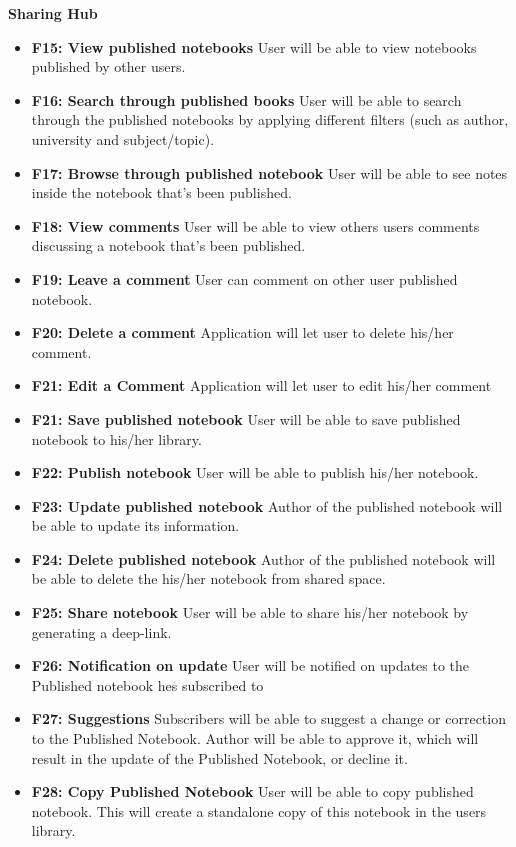 \documentclass[thesis=B,english]{FITthesis}[2012/10/20]
\begin{document}
\bigskip
\textbf{Sharing Hub}
\begin{itemize}
	\item \textbf{F15: View published notebooks} User will be able to view notebooks published by other users.
	\item \textbf{F16: Search through published books} User will be able to search through the published notebooks by applying different filters (such as author, university and subject/topic).
	\item \textbf{F17: Browse through published notebook} User will be able to see notes inside the notebook that's been published.
	\item \textbf{F18: View comments} User will be able to view others users comments discussing a notebook that's been published.
	\item \textbf{F19: Leave a comment} User can comment on other user published notebook.
	\item \textbf{F20: Delete a comment} Application will let user to delete his/her comment.
	\item \textbf{F21: Edit a Comment} Application will let user to edit his/her comment
	\item \textbf{F21: Save published notebook} User will be able to save published notebook to his/her library.
	\item \textbf{F22: Publish notebook} User will be able to publish his/her notebook.
	\item \textbf{F23: Update published notebook} Author of the published notebook will be able to update its information.
	\item \textbf{F24: Delete published notebook} Author of the published notebook will be able to delete the his/her notebook from shared space.
	\item \textbf{F25: Share notebook} User will be able to share his/her notebook by generating a deep-link.
	\item \textbf{F26: Notification on update} User will be notified on updates to the Published notebook hes subscribed to
	\item \textbf{F27: Suggestions} Subscribers will be able to suggest a change or correction to the Published Notebook. Author will be able to approve it, which will result in the update of the Published Notebook, or decline it.
	\item \textbf{F28: Copy Published Notebook} User will be able to copy published notebook. This will create a standalone copy of this notebook in the users library.
 \end{itemize}
\end{document}
